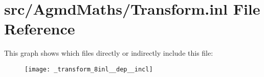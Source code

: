 \hypertarget{_transform_8inl}{\section{src/\+Agmd\+Maths/\+Transform.inl File Reference}
\label{_transform_8inl}
}
This graph shows which files directly or indirectly include this file\+:\nopagebreak
\begin{figure}[H]
\begin{center}
\leavevmode
\texttt{[image: \_transform\_8inl\_\_dep\_\_incl]}
\end{center}
\end{figure}
